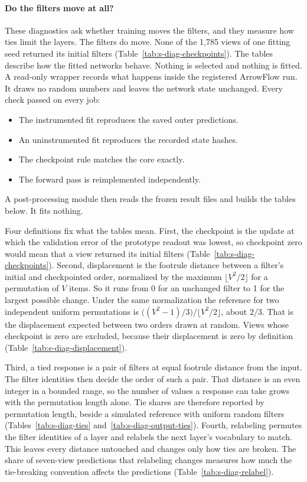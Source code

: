 \clearpage






\paragraph{Do the filters move at all?} These diagnostics ask whether training moves the filters, and they measure how ties limit the layers. The filters do move. None of the 1,785 views of one fitting seed returned its initial filters (Table~\ref{tab:s-diag-checkpoints}). The tables describe how the fitted networks behave. Nothing is selected and nothing is fitted. A read-only wrapper records what happens inside the registered ArrowFlow run. It draws no random numbers and leaves the network state unchanged. Every check passed on every job:
\begin{itemize}[leftmargin=2em,topsep=2pt,itemsep=1pt]
\item The instrumented fit reproduces the saved outer predictions.
\item An uninstrumented fit reproduces the recorded state hashes.
\item The checkpoint rule matches the core exactly.
\item The forward pass is reimplemented independently.
\end{itemize}
A post-processing module then reads the frozen result files and builds the tables below. It fits nothing.

Four definitions fix what the tables mean. First, the checkpoint is the update at which the validation error of the prototype readout was lowest, so checkpoint zero would mean that a view returned its initial filters (Table~\ref{tab:s-diag-checkpoints}). Second, displacement is the footrule distance between a filter's initial and checkpointed order, normalized by the maximum $\lfloor V^2/2 \rfloor$ for a permutation of $V$ items. So it runs from 0 for an unchanged filter to 1 for the largest possible change. Under the same normalization the reference for two independent uniform permutations is $\bigl((V^2-1)/3\bigr)/\lfloor V^2/2\rfloor$, about $2/3$. That is the displacement expected between two orders drawn at random. Views whose checkpoint is zero are excluded, because their displacement is zero by definition (Table~\ref{tab:s-diag-displacement}).

Third, a tied response is a pair of filters at equal footrule distance from the input. The filter identities then decide the order of such a pair. That distance is an even integer in a bounded range, so the number of values a response can take grows with the permutation length alone. Tie shares are therefore reported by permutation length, beside a simulated reference with uniform random filters (Tables~\ref{tab:s-diag-ties} and~\ref{tab:s-diag-output-ties}). Fourth, relabeling permutes the filter identities of a layer and relabels the next layer's vocabulary to match. This leaves every distance untouched and changes only how ties are broken. The share of seven-view predictions that relabeling changes measures how much the tie-breaking convention affects the predictions (Table~\ref{tab:s-diag-relabel}).

